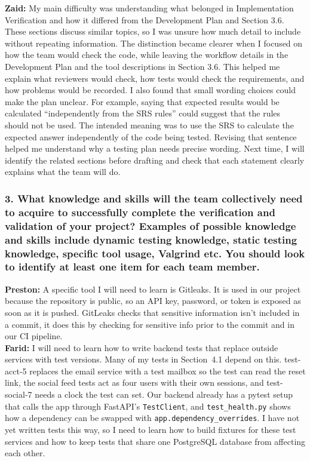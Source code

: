 \documentclass[12pt, titlepage]{article}
\begin{document}
\bigskip
\noindent
\textbf{Zaid:} My main difficulty was understanding what belonged in Implementation Verification and how it differed from the Development Plan and Section 3.6. These sections discuss similar topics, so I was unsure how much detail to include without repeating information. The distinction became clearer when I focused on how the team would check the code, while leaving the workflow details in the Development Plan and the tool descriptions in Section 3.6. This helped me explain what reviewers would check, how tests would check the requirements, and how problems would be recorded. I also found that small wording choices could make the plan unclear. For example, saying that expected results would be calculated “independently from the SRS rules” could suggest that the rules should not be used. The intended meaning was to use the SRS to calculate the expected answer independently of the code being tested. Revising that sentence helped me understand why a testing plan needs precise wording. Next time, I will identify the related sections before drafting and check that each statement clearly explains what the team will do.

\subsubsection*{3. What knowledge and skills will the team collectively need to
acquire to successfully complete the verification and validation of your
project? Examples of possible knowledge and skills include dynamic testing
knowledge, static testing knowledge, specific tool usage, Valgrind etc. You
should look to identify at least one item for each team member.}

\noindent\textbf{Preston:} A specific tool I will need to learn is Gitleaks. It is used in our project because the repository is public, so an API key, password, or token is exposed as soon as it is pushed. GitLeaks checks that sensitive information isn't included in a commit, it does this by checking for sensitive info prior to the commit and in our CI pipeline. \\

\noindent\textbf{Farid:} I will need to learn how to write backend tests that
replace outside services with test versions. Many of my tests in Section~4.1
depend on this. test-acct-5 replaces the email service with a test mailbox so
the test can read the reset link, the social feed tests act as four users with
their own sessions, and test-social-7 needs a clock the test can set. Our
backend already has a pytest setup that calls the app through FastAPI's
\texttt{TestClient}, and \texttt{test\_health.py} shows how a dependency can be
swapped with \texttt{app.dependency\_overrides}. I have not yet written tests
this way, so I need to learn how to build fixtures for these test services and
how to keep tests that share one PostgreSQL database from affecting each
other.
\end{document}
